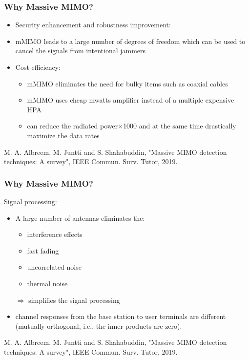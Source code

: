 \documentclass{beamer}
\begin{document}
\begin{frame}[fragile=singleslide]\frametitle{Why Massive MIMO?}
\begin{itemize}
\item Security enhancement and robustness improvement:
\item[] \small mMIMO leads to a large number of degrees of freedom which can be used to cancel the signals from intentional jammers

\vspace{1cm}


\item Cost efficiency:
\begin{itemize}
\item \small mMIMO eliminates the need for bulky items such as coaxial cables

\item \small mMIMO uses cheap mwatts amplifier instead of a multiple expensive  HPA

\item can reduce the radiated power$\times$1000 and at the same time drastically maximize the data rates
\end{itemize}

\end{itemize}

\vspace{1cm}

\tiny M. A. Albreem, M. Juntti and S. Shahabuddin, "Massive MIMO detection techniques: A survey", IEEE Commun. Surv. Tutor, 2019.
\end{frame}



\begin{frame}[fragile=singleslide]\frametitle{Why Massive MIMO?}

Signal processing:
\begin{itemize}
\item A large number of antennas eliminates the:
\begin{itemize}
\item interference effects
\item fast fading
\item uncorrelated noise
\item thermal noise
\end{itemize}
$\Rightarrow$ simplifies the signal processing
\vspace{0.3cm}

\item channel responses from the base station to user terminals are different (mutually orthogonal, i.e., the inner products are zero).

\end{itemize}

\vspace{1.8cm}

\tiny M. A. Albreem, M. Juntti and S. Shahabuddin, "Massive MIMO detection techniques: A survey", IEEE Commun. Surv. Tutor, 2019.

\end{frame}
\end{document}
